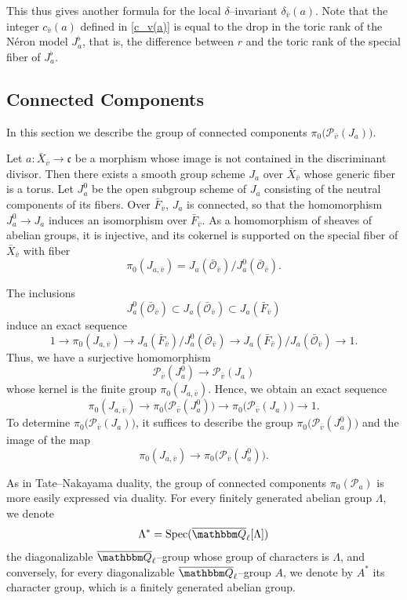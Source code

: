 \documentclass[12pt,english]{smfart}
\numberwithin{equation}{subsection}
\theoremstyle{remark}
\newcommand\calP{{\mathscr P}}
\newcommand\calO{{\mathscr O}}
\newcommand\frakc{{\mathfrak c}}
\newcommand\QQ{{\mathbbm Q}}
\newcommand\Spec{{\rm Spec}}
\newcommand\Ql{{\overline\QQ_\ell}}
\begin{document}
This thus gives another formula for the local $\delta$--invariant $\delta_{\bar v}(a)$. Note that the integer $c_{\bar v}(a)$ defined in \eqref{c_v(a)} is equal to the drop in the toric rank of the N\'eron model $J_a^\flat$, that is, the difference between $r$ and the toric rank of the special fiber of $J_a^\flat$.

\subsection{Connected Components}
In this section we describe the group of connected components $\pi_0\bigl(\calP_{\bar v}(J_a)\bigr)$.

Let $a:\bar X_{\bar v}\to \frakc$ be a morphism whose image is not contained in the discriminant divisor. Then there exists a smooth group scheme $J_a$ over $\bar X_{\bar v}$ whose generic fiber is a torus. Let $J_a^0$ be the open subgroup scheme of $J_a$ consisting of the neutral components of its fibers. Over $\bar F_{\bar v}$, $J_a$ is connected, so that the homomorphism $J_a^0\to J_a$ induces an isomorphism over $\bar F_{\bar v}$. As a homomorphism of sheaves of abelian groups, it is injective, and its cokernel is supported on the special fiber of $\bar X_{\bar v}$ with fiber
$$
\pi_0(J_{a,\bar v}) = J_a(\bar{\calO}_{\bar v})/J_a^0(\bar{\calO}_{\bar v}).
$$

The inclusions
$$
J_a^0(\bar{\calO}_{\bar v})\subset J_a(\bar{\calO}_{\bar v})\subset J_a(\bar{F}_{\bar v})
$$
induce an exact sequence
$$
1\rightarrow \pi_0(J_{a,\bar v}) \rightarrow J_a(\bar{F}_{\bar v})/J_a^0(\bar{\calO}_{\bar v}) \rightarrow J_a(\bar{F}_{\bar v})/J_a(\bar{\calO}_{\bar v}) \rightarrow 1.
$$
Thus, we have a surjective homomorphism
\begin{equation}\label{P_v(J_a^0)->P_v(J_a)}
\calP_{\bar v}(J_a^0) \to \calP_{\bar v}(J_a)
\end{equation}
whose kernel is the finite group $\pi_0(J_{a,\bar v})$. Hence, we obtain an exact sequence
$$
\pi_0(J_{a,\bar v}) \to \pi_0\bigl(\calP_{\bar v}(J_a^0)\bigr) \to \pi_0\bigl(\calP_{\bar v}(J_a)\bigr) \to 1.
$$
To determine $\pi_0\bigl(\calP_{\bar v}(J_a)\bigr)$, it suffices to describe the group $\pi_0\bigl(\calP_{\bar v}(J_a^0)\bigr)$ and the image of the map
$$
\pi_0(J_{a,\bar v}) \to \pi_0\bigl(\calP_{\bar v}(J_a^0)\bigr).
$$

As in Tate--Nakayama duality, the group of connected components $\pi_0(\calP_a)$ is more easily expressed via duality. For every finitely generated abelian group $\Lambda$, we denote
$$
\Lambda^* = \Spec(\Ql[\Lambda])
$$
the diagonalizable $\Ql$--group whose group of characters is $\Lambda$, and conversely, for every diagonalizable $\Ql$--group $A$, we denote by $A^*$ its character group, which is a finitely generated abelian group.
\end{document}
